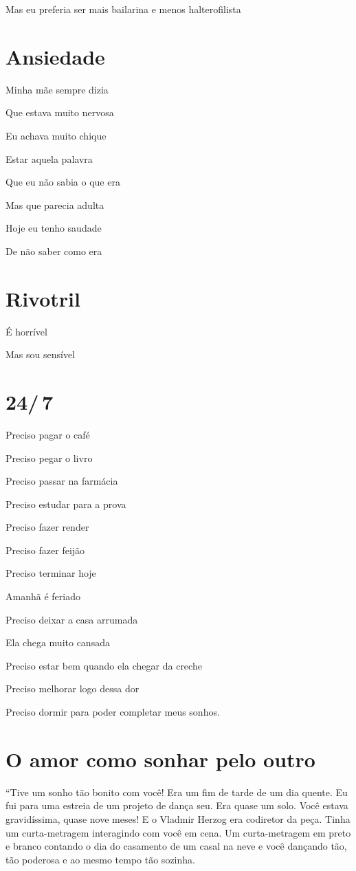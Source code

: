 Mas eu preferia ser mais bailarina e menos halterofilista

\chapter{Ansiedade}

Minha mãe sempre dizia

Que estava muito nervosa

Eu achava muito chique

Estar aquela palavra\medskip 

Que eu não sabia o que era

Mas que parecia adulta

Hoje eu tenho saudade

De não saber como era

\chapter{Rivotril}

É horrível

Mas sou sensível

\chapter{24/\,7}

Preciso pagar o café

Preciso pegar o livro

Preciso passar na farmácia

Preciso estudar para a prova

Preciso fazer render

Preciso fazer feijão

Preciso terminar hoje

Amanhã é feriado

Preciso deixar a casa arrumada

Ela chega muito cansada

Preciso estar bem quando ela chegar da creche

Preciso melhorar logo dessa dor

Preciso dormir para poder completar meus sonhos.

\chapter{O amor como sonhar pelo outro}

``Tive um sonho tão bonito com você! Era um fim de tarde de um dia
quente. Eu fui para uma estreia de um projeto de dança seu. Era quase um
solo. Você estava gravidíssima, quase nove meses! E o Vladmir Herzog era
codiretor da peça. Tinha um curta-metragem interagindo com você em cena.
Um curta-metragem em preto e branco contando o dia do casamento de um
casal na neve e você dançando tão, tão poderosa e ao mesmo tempo tão
sozinha.

